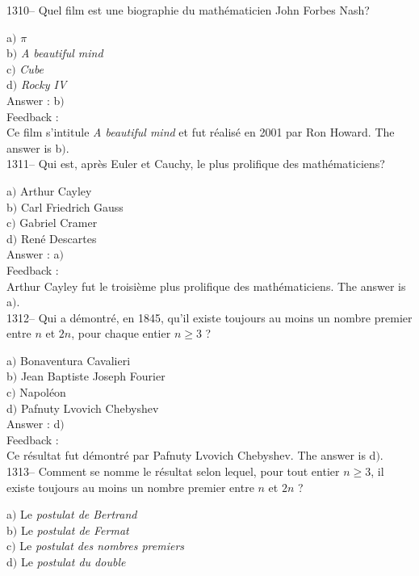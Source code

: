 \documentclass[letterpaper, 12pt]{article}
\begin{document}
1310-- Quel film est une biographie du math\'ematicien John Forbes
Nash?

a$)$ {\sl $\pi$} \\
b$)$ {\sl A beautiful mind} \\
c$)$ {\sl Cube}  \\
d$)$ {\sl Rocky IV}\\

Answer : b$)$\\

Feedback : \\
Ce film s'intitule {\sl A beautiful mind} et fut r\'ealis\'e en 2001
par Ron Howard.
The answer is  b$)$.\\

1311-- Qui est, apr\`es Euler et Cauchy, le plus prolifique des
math\'ematiciens?

a$)$ Arthur Cayley \\
b$)$ Carl Friedrich Gauss \\
c$)$ Gabriel Cramer  \\
d$)$ Ren\'e Descartes\\

Answer : a$)$\\

Feedback : \\
Arthur Cayley fut le troisi\`eme plus prolifique des
math\'ematiciens.
The answer is  a$)$.\\

1312-- Qui a d\'emontr\'e, en 1845, qu'il existe toujours au moins un nombre
premier entre $n$ et $2n$, pour
chaque entier $n\ge3$ ?

a$)$ Bonaventura Cavalieri \\
b$)$ Jean Baptiste Joseph Fourier \\
c$)$ Napol\'eon  \\
d$)$ Pafnuty Lvovich Chebyshev\\

Answer : d$)$\\

Feedback : \\
Ce r\'esultat fut d\'emontr\'e par Pafnuty Lvovich Chebyshev.
The answer is  d$)$.\\

1313-- Comment se nomme le r\'esultat selon lequel, pour tout entier
$n\ge3$, il existe toujours au moins un nombre premier entre $n$ et $2n$ ?

a$)$ Le {\sl postulat de Bertrand} \\
b$)$ Le {\sl postulat de Fermat} \\
c$)$ Le {\sl postulat des nombres premiers}  \\
d$)$ Le {\sl postulat du double}\\
\end{document}
